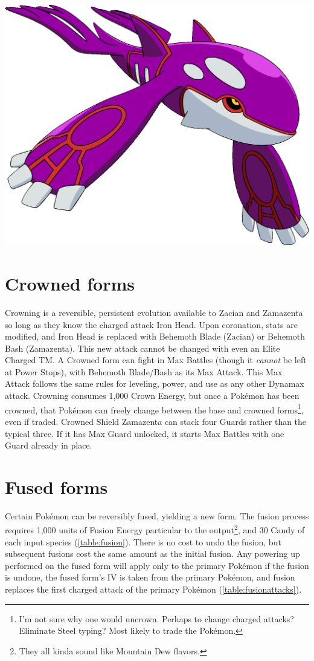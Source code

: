 
\includegraphics[width=\linewidth,keepaspectratio]{images/kyogre.png}
\section{Crowned forms\label{sec:crowned}}
\nopagecolor
Crowning is a reversible, persistent evolution available to Zacian and Zamazenta
 so long as they know the charged attack Iron Head.
Upon coronation, stats are modified, and Iron Head is replaced with Behemoth Blade (Zacian)
  or Behemoth Bash (Zamazenta).
This new attack cannot be changed with even an Elite Charged TM\@.
A Crowned form can fight in Max Battles (though it \textit{cannot} be left at Power Stops), with Behemoth Blade/Bash as its Max Attack.
This Max Attack follows the same rules for leveling, power, and use as any other Dynamax attack.
Crowning consumes 1,000 Crown Energy, but once a Pokémon has been crowned,
  that Pokémon can freely change between the base and crowned
  forms\footnote{I'm not sure why one would uncrown. Perhaps to change charged attacks?
    Eliminate Steel typing? Most likely to trade the Pokémon.}, even if traded.
Crowned Shield Zamazenta can stack four Guards rather than the typical three.
If it has Max Guard unlocked, it starts Max Battles with one Guard already in place.



\section{Fused forms\label{sec:fusion}}
Certain Pokémon can be reversibly fused, yielding a new form.
The fusion process requires 1,000 units of Fusion Energy particular to the output\footnote{They all kinda sound like Mountain Dew flavors.},
 and 30 Candy of each input species (\autoref{table:fusion}).
There is no cost to undo the fusion, but subsequent fusions cost the same amount as the initial fusion.
Any powering up performed on the fused form will apply only to the primary
  Pokémon if the fusion is undone, the fused form's IV is taken from the primary Pokémon,
  and fusion replaces the first charged attack of the primary Pokémon (\autoref{table:fusionattacks}).

